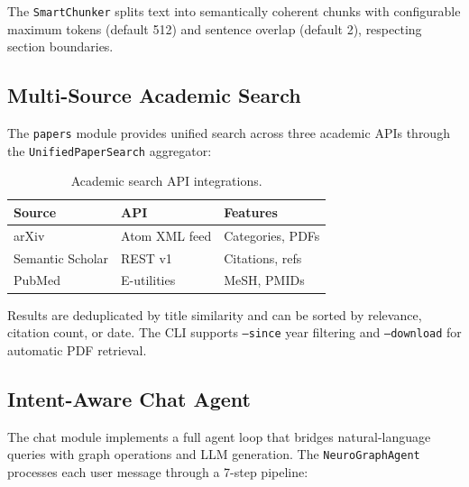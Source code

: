 \documentclass[11pt,a4paper,twocolumn]{article}
\begin{document}
The \texttt{SmartChunker} splits text into semantically coherent
chunks with configurable maximum tokens (default 512) and sentence
overlap (default 2), respecting section boundaries.

\subsection{Multi-Source Academic Search}

The \texttt{papers} module provides unified search across three
academic APIs through the \texttt{UnifiedPaperSearch} aggregator:

\begin{table}[H]
\centering
\footnotesize
\caption{Academic search API integrations.}
\label{tab:papers}
\begin{tabularx}{\columnwidth}{lXX}
\toprule
\textbf{Source} & \textbf{API} & \textbf{Features} \\
\midrule
arXiv & Atom XML feed & Categories, PDFs \\
Semantic Scholar & REST v1 & Citations, refs \\
PubMed & E-utilities & MeSH, PMIDs \\
\bottomrule
\end{tabularx}
\end{table}

Results are deduplicated by title similarity and can be sorted
by relevance, citation count, or date. The CLI supports
\texttt{--since} year filtering and \texttt{--download} for
automatic PDF retrieval.

\subsection{Intent-Aware Chat Agent}
\label{sec:chatagent}

The chat module implements a full agent loop that bridges
natural-language queries with graph operations and LLM generation.
The \texttt{NeuroGraphAgent} processes each user message through a
7-step pipeline:
\end{document}
